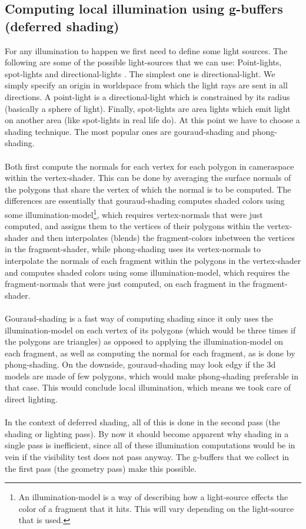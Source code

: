\documentclass{ACGSeminar}
\begin{document}
	\subsection{Computing local illumination using g-buffers (deferred shading)}
		For any illumination to happen we first need to define some light sources. The following are some of the possible light-sources that we can use:
		Point-lights, spot-lights and directional-lights \cite{DST}. The simplest one is directional-light. We simply specify an origin in worldspace from which the light rays are sent in all directions. A point-light is a directional-light which is constrained by its radius (basically a sphere of light). Finally, spot-lights are area lights which emit light on another area (like spot-lights in real life do). 
		At this point we have to choose a shading technique. The most popular ones are gouraud-shading and phong-shading. \\\\
		Both first compute the normals for each vertex for each polygon in cameraspace within the vertex-shader. This can be done by averaging the surface normals of the polygons that share the vertex of which the normal is to be computed. The differences are essentially that gouraud-shading computes shaded colors using some illumination-model\footnote{An illumination-model is a way of describing how a light-source effects the color of a fragment that it hits. This will vary depending on the light-source that is used.}, which requires vertex-normals that were just computed, and assigns them to the vertices of their polygons within the vertex-shader and then interpolates (blends) the fragment-colors inbetween the vertices in the fragment-shader, while phong-shading uses its vertex-normals to interpolate the normals of each fragment within the polygons in the vertex-shader and computes shaded colors using some illumination-model, which requires the fragment-normals that were just computed, on each fragment in the fragment-shader. \\\\
		Gouraud-shading is a fast way of computing shading since it only uses the illumination-model on each vertex of its polygons (which would be three times if the polygons are triangles) as opposed to applying the illumination-model on each fragment, as well as computing the normal for each fragment, as is done by phong-shading. On the downside, gouraud-shading may look edgy if the 3d models are made of few polygons, which would make phong-shading preferable in that case. This would conclude local illumination, which means we took care of direct lighting. \\\\
		In the context of deferred shading, all of this is done in the second pass (the shading or lighting pass). By now it should become apparent why shading in a single pass is inefficient, since all of these illumination computations would be in vein if the visibility test does not pass anyway. The g-buffers that we collect in the first pass (the geometry pass) make this possible. 
\end{document}
